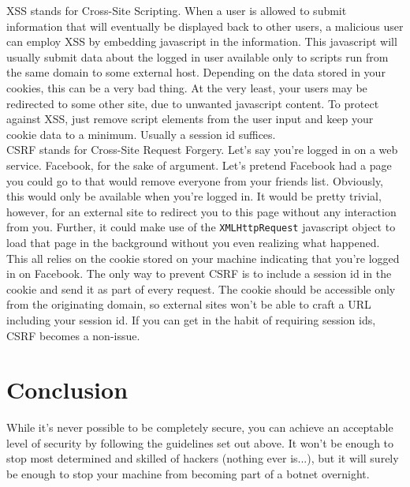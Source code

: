 \documentclass[10pt,letterpaper,titlepage]{article}
\begin{document}
\noindent XSS stands for Cross-Site Scripting. When a user is allowed to submit information that will eventually be displayed back to other users, a malicious user can employ XSS by embedding javascript in the information. This javascript will usually submit data about the logged in user available only to scripts run from the same domain to some external host. Depending on the data stored in your cookies, this can be a very bad thing. At the very least, your users may be redirected to some other site, due to unwanted javascript content. To protect against XSS, just remove script elements from the user input and keep your cookie data to a minimum. Usually a session id suffices.
\\

\noindent CSRF stands for Cross-Site Request Forgery. Let's say you're logged in on a web service. Facebook, for the sake of argument. Let's pretend Facebook had a page you could go to that would remove everyone from your friends list. Obviously, this would only be available when you're logged in. It would be pretty trivial, however, for an external site to redirect you to this page without any interaction from you. Further, it could make use of the \texttt{XMLHttpRequest} javascript object to load that page in the background without you even realizing what happened.\cite{csrf} This all relies on the cookie stored on your machine indicating that you're logged in on Facebook. The only way to prevent CSRF is to include a session id in the cookie and send it as part of every request. The cookie should be accessible only from the originating domain, so external sites won't be able to craft a URL including your session id. If you can get in the habit of requiring session ids, CSRF becomes a non-issue.

\section*{Conclusion}
While it's never possible to be completely secure, you can achieve an acceptable level of security by following the guidelines set out above. It won't be enough to stop most determined and skilled of hackers (nothing ever is...), but it will surely be enough to stop your machine from becoming part of a botnet overnight.


\newpage 


\end{document}
